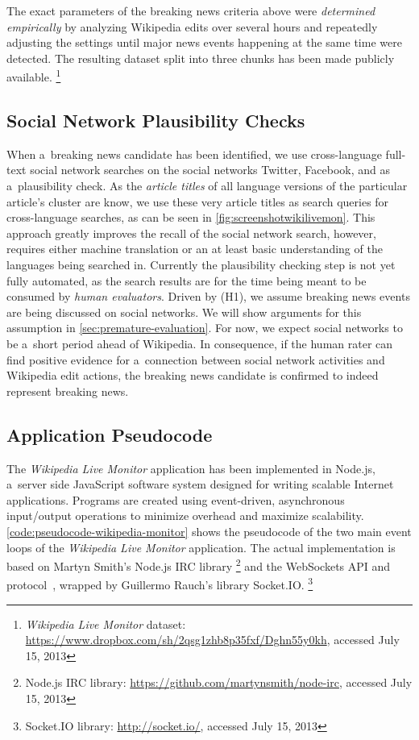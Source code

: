 The exact parameters of the breaking news criteria above
were \emph{determined empirically} by analyzing Wikipedia edits
over several hours and repeatedly adjusting the settings until
major news events happening at the same time were detected.
The resulting dataset split into three chunks has been made publicly available.%
\footnote{\emph{Wikipedia Live Monitor} dataset: \url{https://www.dropbox.com/sh/2qsg1zhb8p35fxf/Dghn55y0kh},
accessed July 15, 2013}

\subsection{Social Network Plausibility Checks}

When a~breaking news candidate has been identified,
we use cross-language full-text social network searches 
on the social networks Twitter, Facebook, and \googleplus
as a~plausibility check.
As the \emph{article titles} of all language versions
of the particular article's cluster are know,
we use these very article titles as search queries for cross-language searches,
as can be seen in \autoref{fig:screenshotwikilivemon}.
This approach greatly improves the recall of the social network search,
however, requires either machine translation or an at least basic understanding
of the languages being searched in.
Currently the plausibility checking step is not yet fully automated,
as the search results are for the time being meant to be consumed by \emph{human evaluators}.
Driven by (H1), we assume breaking news events are being discussed on social networks.
We will show arguments for this assumption in \autoref{sec:premature-evaluation}.
For now, we expect social networks to be a~short period ahead of Wikipedia.
In consequence, if the human rater can find positive evidence
for a~connection between social network activities and Wikipedia edit actions,
the breaking news candidate is confirmed to indeed represent breaking news.

\subsection{Application Pseudocode}

The \emph{Wikipedia Live Monitor} application has been implemented in Node.js,
a~server side JavaScript software system
designed for writing scalable Internet applications.
Programs are created using event-driven, asynchronous input/output operations
to minimize overhead and maximize scalability.
\autoref{code:pseudocode-wikipedia-monitor} shows the pseudocode of the two main event loops of the
\emph{Wikipedia Live Monitor} application.
The actual implementation is based on 
Martyn Smith's Node.js IRC library%
\footnote{Node.js IRC library: \url{https://github.com/martynsmith/node-irc},
accessed July 15, 2013} and
the WebSockets API and protocol~\cite{hickson2012websockets},
wrapped by  Guillermo Rauch's library Socket.IO.%
\footnote{Socket.IO library: \url{http://socket.io/},
accessed July 15, 2013}



